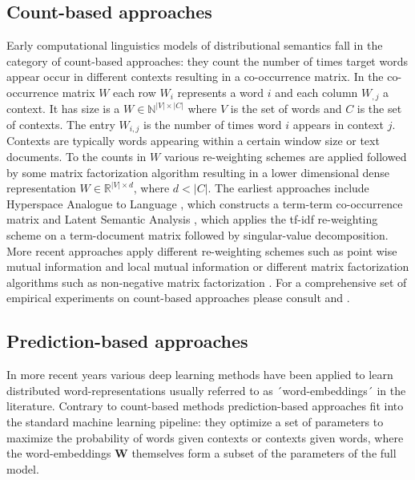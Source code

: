 \subsection{Count-based approaches}
\label{sec:count}
Early computational linguistics models of distributional semantics fall in the category of
count-based approaches: they count the number of times target words appear occur in different
contexts resulting in a co-occurrence matrix. In the co-occurrence matrix
$W$ each row $W_i$ represents a word $i$ and each column $W_{,j}$ a context. It has size
is a $W \in \mathbb{N}^{|V| \times |C|}$ where $V$ is the set of words and $C$ is
the set of contexts.
The entry $W_{i,j}$ is the number of times word $i$ appears in context $j$.
Contexts are typically words appearing within a certain window size or text documents.
To the counts in $W$ various re-weighting schemes are applied followed by some matrix factorization algorithm
resulting in a lower dimensional dense representation $W \in \mathbb{R}^{|V| \times d}$, where $d < |C|$.
The earliest approaches include Hyperspace Analogue to Language \citep{lund1996producing},
which constructs a term-term co-occurrence matrix and Latent Semantic Analysis \citep{dumais2004latent},
which applies the tf-idf re-weighting scheme on a term-document matrix followed by singular-value decomposition.
More recent approaches apply different re-weighting schemes such as point wise mutual information and local mutual
information \citep{evert2005statistics} or different matrix factorization algorithms such as non-negative
matrix factorization \citep{baroni2014don}. For a comprehensive set of empirical experiments on count-based
approaches please consult \cite{bullinaria2007extracting} and \cite{bullinaria2012extracting}.

\subsection{Prediction-based approaches}
\label{sec:pred}
In more recent years
various deep learning methods have been applied to learn distributed word-representations usually referred to
as ´word-embeddings´ in the literature. Contrary to count-based methods prediction-based approaches 
fit into the
standard machine learning pipeline: they optimize a set of parameters to maximize the probability of words
given contexts or contexts given words, where the word-embeddings $\mathbf{W}$
themselves form a subset of the parameters of the full model. 


